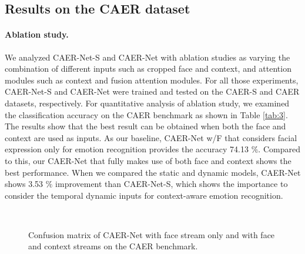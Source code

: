 \documentclass[10pt,twocolumn,letterpaper]{article}
\newcommand{\tabref}[1]{Table \ref{#1}}
\begin{document}
\subsection{Results on the CAER dataset}\label{sec:53}
\paragraph{Ablation study.}
We analyzed CAER-Net-S and CAER-Net with ablation studies as varying the combination of different inputs such as cropped face and context, and attention modules such as context and fusion attention modules.
For all those experiments, CAER-Net-S and CAER-Net were trained and tested on the CAER-S and CAER datasets, respectively.
For quantitative analysis of ablation study, we examined the classification accuracy on the CAER benchmark as shown in \tabref{tab:3}. The results show that the best result can be obtained when both the face and context are used as inputs.
As our baseline, CAER-Net w/F that considers facial expression only for emotion recognition provides the accuracy 74.13 $\%$. Compared to this, our CAER-Net that fully makes use of both face and context shows the best performance.
When we compared the static and dynamic models, CAER-Net shows 3.53 $\%$ improvement than CAER-Net-S, which shows the importance to consider the temporal dynamic inputs for context-aware emotion recognition.


\begin{figure}
	\centering
	\renewcommand{\thesubfigure}{}
	\hfill
	\hfill\\
	\caption{Confusion matrix of CAER-Net with face stream only and with face and context streams on the CAER benchmark.}
	\label{fig:7}\vspace{-8pt}
\end{figure}
\end{document}
